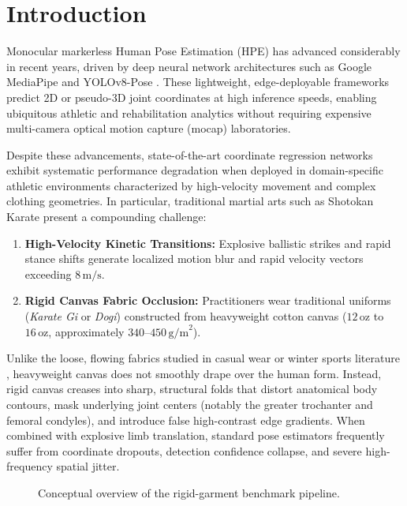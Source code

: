 \section{Introduction}
\label{sec:intro}

Monocular markerless Human Pose Estimation (HPE) has advanced considerably in recent years, driven by deep neural network architectures such as Google MediaPipe \cite{lugaresi2019mediapipe} and YOLOv8-Pose \cite{jocher2023yolov8}. These lightweight, edge-deployable frameworks predict 2D or pseudo-3D joint coordinates at high inference speeds, enabling ubiquitous athletic and rehabilitation analytics without requiring expensive multi-camera optical motion capture (mocap) laboratories.

Despite these advancements, state-of-the-art coordinate regression networks exhibit systematic performance degradation when deployed in domain-specific athletic environments characterized by high-velocity movement and complex clothing geometries. In particular, traditional martial arts such as Shotokan Karate present a compounding challenge:
\begin{enumerate}
    \item \textbf{High-Velocity Kinetic Transitions:} Explosive ballistic strikes and rapid stance shifts generate localized motion blur and rapid velocity vectors exceeding $8\,\text{m/s}$.
    \item \textbf{Rigid Canvas Fabric Occlusion:} Practitioners wear traditional uniforms (\textit{Karate Gi} or \textit{Dogi}) constructed from heavyweight cotton canvas ($12\,\text{oz}$ to $16\,\text{oz}$, approximately $340$--$450\,\text{g/m}^2$).
\end{enumerate}

Unlike the loose, flowing fabrics studied in casual wear or winter sports literature \cite{looseclothes2022hfr}, heavyweight canvas does not smoothly drape over the human form. Instead, rigid canvas creases into sharp, structural folds that distort anatomical body contours, mask underlying joint centers (notably the greater trochanter and femoral condyles), and introduce false high-contrast edge gradients. When combined with explosive limb translation, standard pose estimators frequently suffer from coordinate dropouts, detection confidence collapse, and severe high-frequency spatial jitter.

\begin{figure}[t]
    \centering
    \caption{Conceptual overview of the rigid-garment benchmark pipeline.}
    \label{fig:overview}
\end{figure}


